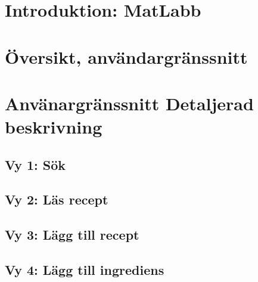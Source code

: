 
\chapter{Introduktion: MatLabb}


\chapter{Översikt, användargränssnitt}


\chapter{Använargränssnitt Detaljerad beskrivning}

  \section{Vy 1: Sök}
  
  \section{Vy 2: Läs recept}
  
  \section{Vy 3: Lägg till recept}
  
  \section{Vy 4: Lägg till ingrediens}
  
  
